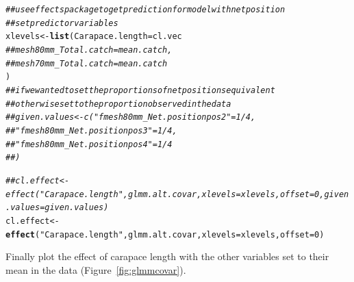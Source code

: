 \documentclass[12pt]{article}\usepackage[]{graphicx}\usepackage[]{color}
\makeatletter
\newcommand{\hlnum}[1]{\textcolor[rgb]{0.686,0.059,0.569}{#1}}%
\newcommand{\hlstr}[1]{\textcolor[rgb]{0.192,0.494,0.8}{#1}}%
\newcommand{\hlcom}[1]{\textcolor[rgb]{0.678,0.584,0.686}{\textit{#1}}}%
\newcommand{\hlstd}[1]{\textcolor[rgb]{0.345,0.345,0.345}{#1}}%
\newcommand{\hlkwb}[1]{\textcolor[rgb]{0.69,0.353,0.396}{#1}}%
\newcommand{\hlkwc}[1]{\textcolor[rgb]{0.333,0.667,0.333}{#1}}%
\newcommand{\hlkwd}[1]{\textcolor[rgb]{0.737,0.353,0.396}{\textbf{#1}}}%
\newenvironment{kframe}{%
 \def\at@end@of@kframe{}%
 \ifinner\ifhmode%
  \def\at@end@of@kframe{\end{minipage}}%
  \begin{minipage}{\columnwidth}%
 \fi\fi%
 \def\FrameCommand##1{\hskip\@totalleftmargin \hskip-\fboxsep
 \colorbox{shadecolor}{##1}\hskip-\fboxsep
     \hskip-\linewidth \hskip-\@totalleftmargin \hskip\columnwidth}%
 \MakeFramed {\advance\hsize-\width
   \@totalleftmargin\z@ \linewidth\hsize
   \@setminipage}}%
 {\par\unskip\endMakeFramed%
 \at@end@of@kframe}
\newenvironment{knitrout}{}{} %
\makeatother
\begin{document}
\begin{knitrout}
\begin{kframe}
{\ttfamily\noindent{}}\begin{alltt}
\hlcom{## use effects package to get prediction for model with net position}
\hlcom{## set predictor variables}
\hlstd{xlevels} \hlkwb{<-} \hlkwd{list}\hlstd{(}\hlkwc{Carapace.length} \hlstd{= cl.vec}
                \hlcom{##mesh80mm_Total.catch = mean.catch,}
                \hlcom{##mesh70mm_Total.catch = mean.catch}
                \hlstd{)}
\hlcom{## if we wanted to set the proportions of net positions equivalent}
\hlcom{## otherwise set to the proportion observed in the data}
\hlcom{##given.values <- c("fmesh80mm_Net.positionpos2" = 1/4,}
\hlcom{##                  "fmesh80mm_Net.positionpos3" = 1/4,}
\hlcom{##                  "fmesh80mm_Net.positionpos4" = 1/4}
\hlcom{##                  )}

\hlcom{##cl.effect <- effect("Carapace.length", glmm.alt.covar, xlevels = xlevels, offset = 0, given.values = given.values)}
\hlstd{cl.effect} \hlkwb{<-} \hlkwd{effect}\hlstd{(}\hlstr{"Carapace.length"}\hlstd{, glmm.alt.covar,} \hlkwc{xlevels} \hlstd{= xlevels,} \hlkwc{offset} \hlstd{=} \hlnum{0}\hlstd{)}
\end{alltt}
\end{kframe}
\end{knitrout}

Finally plot the effect of carapace length with the other variables set to their mean in the data (Figure~\ref{fig:glmmcovar}).
\end{document}

